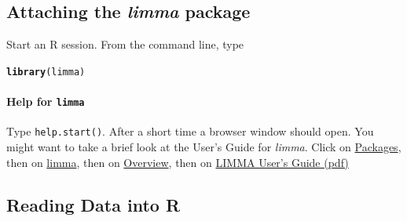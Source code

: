 \documentclass[a4paper,9pt]{article}\usepackage[]{graphicx}\usepackage[]{xcolor}
\makeatletter
\newcommand{\hlstd}[1]{\textcolor[rgb]{0.345,0.345,0.345}{#1}}%
\newcommand{\hlkwd}[1]{\textcolor[rgb]{0.737,0.353,0.396}{\textbf{#1}}}%
\newenvironment{kframe}{%
 \def\at@end@of@kframe{}%
 \ifinner\ifhmode%
  \def\at@end@of@kframe{\end{minipage}}%
  \begin{minipage}{\columnwidth}%
 \fi\fi%
 \def\FrameCommand##1{\hskip\@totalleftmargin \hskip-\fboxsep
 \colorbox{shadecolor}{##1}\hskip-\fboxsep
     \hskip-\linewidth \hskip-\@totalleftmargin \hskip\columnwidth}%
 \MakeFramed {\advance\hsize-\width
   \@totalleftmargin\z@ \linewidth\hsize
   \@setminipage}}%
 {\par\unskip\endMakeFramed%
 \at@end@of@kframe}
\newenvironment{knitrout}{}{} %
\makeatother
\begin{document}
\subsection*{Attaching the \textit{limma} package}

Start an R session.  From the command line, type
\begin{knitrout}
\color{fgcolor}\begin{kframe}
\begin{alltt}
\hlkwd{library}\hlstd{(limma)}
\end{alltt}
\end{kframe}
\end{knitrout}

\paragraph{Help for \texttt{limma}}

Type \texttt{help.start()}.  After a short time a browser window should
open.  You might want to take a brief look at the User's Guide for
\textit{limma}.  Click on \underline{Packages}, then on
\underline{limma}, then on \underline{Overview}, then on
\underline{LIMMA User's Guide (pdf)}

\subsection{Reading Data into R}
\end{document}
